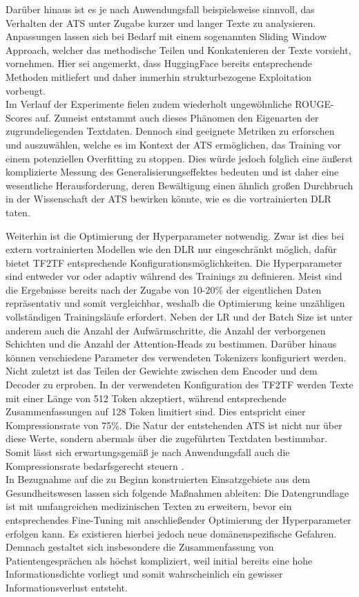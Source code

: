 \noindent
Darüber hinaus ist es je nach Anwendungsfall beispielsweise sinnvoll, das Verhalten der \ac{ATS} unter Zugabe kurzer und langer Texte zu analysieren. Anpassungen lassen sich bei Bedarf mit einem sogenannten Sliding Window Approach, welcher das methodische Teilen und Konkatenieren der Texte vorsieht, vornehmen. Hier sei angemerkt, dass HuggingFace bereits entsprechende Methoden mitliefert und daher immerhin strukturbezogene Exploitation vorbeugt.\\

\noindent
Im Verlauf der Experimente fielen zudem wiederholt ungewöhnliche \ac{ROUGE}-Scores auf. Zumeist entstammt auch dieses Phänomen den Eigenarten der zugrundeliegenden Textdaten. Dennoch sind geeignete Metriken zu erforschen und auszuwählen, welche es im Kontext der \ac{ATS} ermöglichen, das Training vor einem potenziellen Overfitting zu stoppen. Dies würde jedoch folglich eine äußerst komplizierte Messung des Generalisierungseffektes bedeuten und ist daher eine wesentliche Herausforderung, deren Bewältigung einen ähnlich großen Durchbruch in der Wissenschaft der \ac{ATS} bewirken könnte, wie es die vortrainierten \ac{DLR} taten.
\newpage

\noindent
Weiterhin ist die Optimierung der Hyperparameter notwendig. Zwar ist dies bei extern vortrainierten Modellen wie den \ac{DLR} nur eingeschränkt möglich, dafür bietet \ac{TF2TF} entsprechende Konfigurationsmöglichkeiten. Die Hyperparameter sind entweder vor oder adaptiv während des Trainings zu definieren. Meist sind die Ergebnisse bereits nach der Zugabe von 10-20\% der eigentlichen Daten repräsentativ und somit vergleichbar, weshalb die Optimierung keine unzähligen vollständigen Trainingsläufe erfordert. Neben der \ac{LR} und der Batch Size ist unter anderem auch die Anzahl der Aufwärmschritte, die Anzahl der verborgenen Schichten und die Anzahl der Attention-Heads zu bestimmen. Darüber hinaus können verschiedene Parameter des verwendeten Tokenizers konfiguriert werden. Nicht zuletzt ist das Teilen der Gewichte zwischen dem Encoder und dem Decoder zu erproben. In der verwendeten Konfiguration des \ac{TF2TF} werden Texte mit einer Länge von 512 Token akzeptiert, während entsprechende Zusammenfassungen auf 128 Token limitiert sind. Dies entspricht einer Kompressionsrate von 75\%. Die Natur der entstehenden \ac{ATS} ist nicht nur über diese Werte, sondern abermals über die zugeführten Textdaten bestimmbar. Somit lässt sich erwartungsgemäß je nach Anwendungsfall auch die Kompressionsrate bedarfsgerecht steuern \cite[S.~14-15]{NIT19}.\\

\noindent
In Bezugnahme auf die zu Beginn konstruierten Einsatzgebiete aus dem Gesundheitswesen lassen sich folgende Maßnahmen ableiten: Die Datengrundlage ist mit umfangreichen medizinischen Texten zu erweitern, bevor ein entsprechendes Fine-Tuning mit anschließender Optimierung der Hyperparameter erfolgen kann. Es existieren hierbei jedoch neue domänenspezifische Gefahren. Demnach gestaltet sich insbesondere die Zusammenfassung von Patientengesprächen als höchst kompliziert, weil initial bereits eine hohe Informationsdichte vorliegt und somit wahrscheinlich ein gewisser Informationsverlust entsteht.
